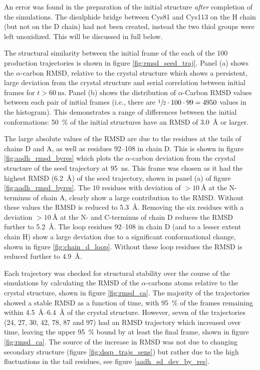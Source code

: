 An error was found in the preparation of the initial structure \emph{after} completion of the simulations. The disulphide bridge between Cys81 and Cys113 on the H chain (but not on the D chain) had not been created, instead the two thiol groups were left unoxidized. This will be discussed in full below. 

 The structural similarity between the initial frame of the each of the 100 production trajectories is shown in figure \ref{fig:rmsd_seed_traj}. Panel (a) shows the $\alpha$-carbon RMSD, relative to the crystal structure which shows a persistent, large deviation from the crystal structure and serial correlation between initial frames for $t>\SI{60}{\nano\second}$.  Panel (b) shows the distribution of $\alpha$-Carbon RMSD values between each pair of initial frames (i.e., there are $\sfrac{1}{2}\cdot 100\cdot 99 = 4950$ values in the histogram). This demonstrates a range of differences between the initial conformations: \SI{50}{\percent} of the initial structures have an RMSD of \SI{3.0}{\angstrom} or larger.  
 
The large absolute values of the RMSD are due to the residues at the tails of chains D and A, as well as residues \numrange[range-phrase=\text{--}]{92}{108} in chain D. This is shown in figure \ref{fig:aadh_rmsd_byres} which plots the $\alpha$-carbon deviation from the crystal structure of the seed trajectory at \SI{95}{\nano\second}. This frame was chosen as it had the highest RMSD (\SI{6.2}{\angstrom}) of the seed trajectory, shown in panel (a) of figure \ref{fig:aadh_rmsd_byres}. The $10$ residues with deviation of $>\SI{10}{\angstrom}$ at the N-terminus of chain A, clearly show a large contribution to the RMSD. Without these values the RMSD is reduced to \SI{5.3}{\angstrom}. Removing the six residues with a deviation $> \SI{10}{\angstrom}$  at the N- and C-terminus of chain D reduces the RMSD further to \SI{5.2}{\angstrom}. The loop residues \numrange[range-phrase=\text{--}]{92}{108} in chain D (and to a lesser extent chain H) show a large deviation due to a significant conformational change, shown in figure \ref{fig:chain_d_loop}. Without these loop residues the RMSD is reduced further to \SI{4.9}{\angstrom}. 

Each trajectory was checked for structural stability over the course of the simulations by calculating the RMSD of the $\alpha$-carbons atoms relative to the crystal structure, shown in figure \ref{fig:rmsd_ca}. The majority of the trajectories showed a stable RMSD as a function of time, with \SI{95}{\percent} of the frames remaining within \SIrange{4.5}{6.4}{\angstrom} of the crystal structure. However, seven of the trajectories (24, 27, 30, 42, 78, 87 and 97) had an RMSD trajectory which increased over time, leaving the upper \SI{95}{\percent} bound by at least the final frame, shown in figure \ref{fig:rmsd_ca}. The source of the increase in RMSD was not due to changing secondary structure (figure \ref{fig:dssp_trajs_sens}) but rather due to the high fluctuations in the tail residues, see figure \ref{aadh_sd_dev_by_res}. 


